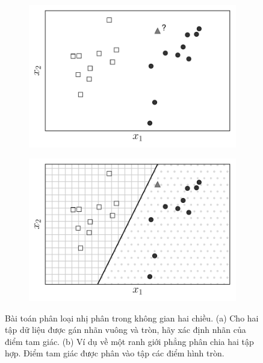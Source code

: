 \begin{figure}[t]
     \begin{subfigure}{0.49\textwidth}
     \includegraphics[width=0.99\linewidth]{ebookML_src/src/perceptron/pla1.pdf}
     \caption{}
     \label{fig:9_1a}
     \end{subfigure}
     \begin{subfigure}{0.49\textwidth}
     \includegraphics[width=0.99\linewidth]{ebookML_src/src/perceptron/pla2.pdf}
     \caption{}
     \label{fig:9_1b}
     \end{subfigure}
     \caption{
      Bài toán phân loại nhị phân trong không gian hai chiều. (a) Cho hai tập dữ liệu được gán nhãn vuông và tròn, hãy xác định nhãn của điểm tam giác. (b) Ví dụ về một ranh giới phẳng phân chia hai tập hợp. Điểm tam giác được phân vào tập các điểm hình tròn.
     }
     \label{fig:9_1}
 \end{figure}
  




